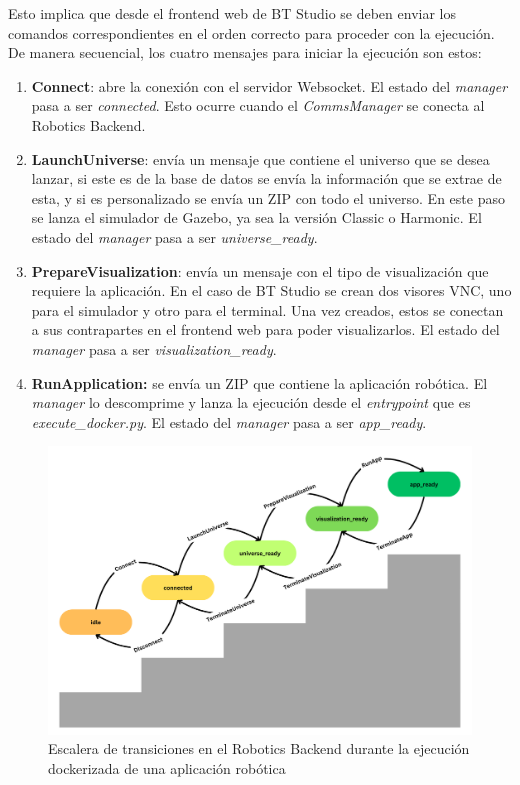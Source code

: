 Esto implica que desde el frontend web de BT Studio se deben enviar los comandos correspondientes en el orden correcto para proceder con la ejecución. De manera secuencial, los cuatro mensajes para iniciar la ejecución son estos:

\begin{enumerate}
    \item \textbf{Connect}: abre la conexión con el servidor Websocket. El estado del \textit{manager} pasa a ser \textit{connected}. Esto ocurre cuando el \textit{CommsManager} se conecta al Robotics Backend.
     
    \item \textbf{LaunchUniverse}: envía un mensaje que contiene el universo que se desea lanzar, si este es de la base de datos se envía la información que se extrae de esta, y si es personalizado se envía un ZIP con todo el universo. En este paso se lanza el simulador de Gazebo, ya sea la versión Classic o Harmonic. El estado del \textit{manager} pasa a ser \textit{universe\_ready}. 
     
    \item \textbf{PrepareVisualization}: envía un mensaje con el tipo de visualización que requiere la aplicación. En el caso de BT Studio se crean dos visores VNC, uno para el simulador y otro para el terminal. Una vez creados, estos se conectan a sus contrapartes en el frontend web para poder visualizarlos. El estado del \textit{manager} pasa a ser \textit{visualization\_ready}. 
     
    \item \textbf{RunApplication:} se envía un ZIP que contiene la aplicación robótica. El \textit{manager} lo descomprime y lanza la ejecución desde el \textit{entrypoint} que es \textit{execute\_docker.py}. El estado del \textit{manager} pasa a ser \textit{app\_ready}.
\end{enumerate}

\begin{figure}[H]
    \centering
    \includegraphics[width=\textwidth]{figures/bt-studio/radi_ladder.png}
    \caption{Escalera de transiciones en el Robotics Backend durante la ejecución dockerizada de una aplicación robótica}
    \label{fig:radi_ladder}
\end{figure}

